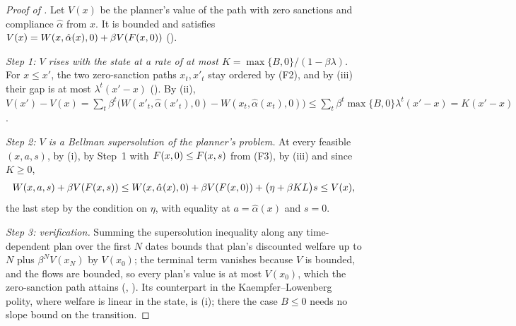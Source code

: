 \begin{proof}[Proof of ]
Let $V(x)$ be the planner's value of the path with zero sanctions and compliance
$\hat\alpha$ from $x$. It is bounded and satisfies
$V(x)=W(x,\hat\alpha(x),0)+\beta V(F(x,0))$
().

\emph{Step 1: $V$ rises with the state at a rate of at most
$K=\max\{B,0\}/(1-\beta\lambda)$.} For $x\le x'$, the two zero-sanction paths
$x_t,x'_t$ stay ordered by \textup{(F2)}, and by (iii) their gap is at most
$\lambda^t(x'-x)$ (). By (ii),
$V(x')-V(x)=\sum_t\beta^t\bigl(W(x'_t,\hat\alpha(x'_t),0)-W(x_t,\hat\alpha(x_t),0)\bigr)
\le\sum_t\beta^t\max\{B,0\}\lambda^t(x'-x)=K(x'-x)$.

\emph{Step 2: $V$ is a Bellman supersolution of the planner's problem.} At every
feasible $(x,a,s)$, by (i), by Step~1 with $F(x,0)\le F(x,s)$ from \textup{(F3)},
by (iii) and since $K\ge0$,
\[
W(x,a,s)+\beta V(F(x,s))
\le W(x,\hat\alpha(x),0)+\beta V(F(x,0))+\bigl(\eta+\beta KL\bigr)s
\le V(x),
\]
the last step by the condition on $\eta$, with equality at $a=\hat\alpha(x)$ and
$s=0$.

\emph{Step 3: verification.} Summing the supersolution inequality along any
time-dependent plan over the first $N$ dates bounds that plan's discounted welfare
up to $N$ plus $\beta^NV(x_N)$ by $V(x_0)$; the terminal term vanishes because $V$
is bounded, and the flows are bounded, so every plan's value is at most $V(x_0)$,
which the zero-sanction path attains
(,
). Its counterpart in the Kaempfer--Lowenberg
polity, where welfare is linear in the state, is
(i); there the case $B\le0$ needs no slope
bound on the transition.
\end{proof}

